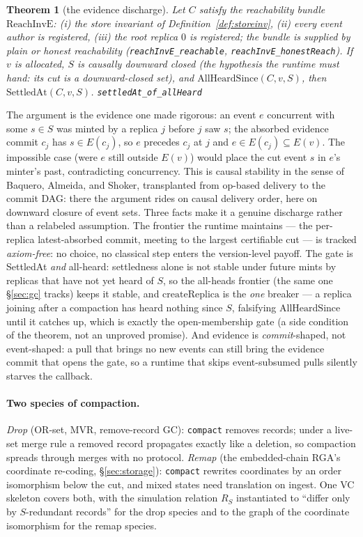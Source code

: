 \documentclass[11pt]{article}
\newtheorem{theorem}{Theorem}[section]
\newcommand{\lean}[1]{\texttt{#1}}
\newcommand{\code}[1]{\texttt{#1}}
\begin{document}
\begin{theorem}[the evidence discharge]
\label{thm:evidence}
Let $C$ satisfy the reachability bundle $\mathrm{ReachInvE}$: (i) the
store invariant of Definition~\ref{def:storeinv}, (ii) every event
author is registered, (iii) the root replica $0$ is registered; the
bundle is supplied by plain or honest reachability
(\lean{reachInvE\_reachable}, \lean{reachInvE\_honestReach}). If $v$ is
allocated, $S$ is causally downward closed (the hypothesis the runtime
must hand: its cut is a downward-closed set), and
$\mathrm{AllHeardSince}(C, v, S)$, then $\mathrm{SettledAt}(C, v, S)$.
\hfill\lean{settledAt\_of\_allHeard}
\end{theorem}

The
argument is the evidence one made rigorous: an event $e$ concurrent with
some $s \in S$ was minted by a replica $j$ before $j$ saw $s$; the
absorbed evidence commit $c_j$ has $s \in E(c_j)$, so $e$ precedes $c_j$
at $j$ and $e \in E(c_j) \subseteq E(v)$. The impossible case (were $e$
still outside $E(v)$) would place the cut event $s$ in $e$'s minter's
past, contradicting concurrency. This is causal stability in the sense
of Baquero, Almeida, and Shoker, transplanted from op-based delivery to
the commit DAG: there the argument rides on causal delivery order, here
on downward closure of event sets. Three facts make it a genuine
discharge rather than a relabeled assumption. The frontier the runtime
maintains --- the per-replica latest-absorbed commit, meeting to the
largest certifiable cut --- is tracked \emph{axiom-free}: no choice, no
classical step enters the version-level payoff. The gate is SettledAt
\emph{and} all-heard: settledness alone is not stable under future mints
by replicas that have not yet heard of $S$, so the all-heads frontier
(the same one \S\ref{sec:gc} tracks) keeps it stable, and
$\mathrm{createReplica}$ is the \emph{one} breaker --- a replica joining
after a compaction has heard nothing since $S$, falsifying
$\mathrm{AllHeardSince}$ until it catches up, which is exactly the
open-membership gate (a side condition of the theorem, not an unproved
promise). And evidence is \emph{commit}-shaped, not event-shaped: a pull
that brings no new events can still bring the evidence commit that opens
the gate, so a runtime that skips event-subsumed pulls silently starves
the callback.

\paragraph{Two species of compaction.} \emph{Drop} (OR-set, MVR,
remove-record GC): \code{compact} removes records; under a live-set
merge rule a removed record propagates exactly like a deletion, so
compaction spreads through merges with no protocol. \emph{Remap} (the
embedded-chain RGA's coordinate re-coding, \S\ref{sec:storage}):
\code{compact} rewrites coordinates by an order isomorphism below the
cut, and mixed states need translation on ingest. One VC skeleton
covers both, with the simulation relation $R_S$ instantiated to
``differ only by $S$-redundant records'' for the drop species and to
the graph of the coordinate isomorphism for the remap species.
\end{document}

